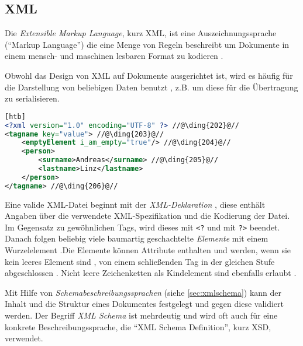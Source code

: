 \subsection{XML}

\begin{thesisDefinition}[XML]
Die \emph{Extensible Markup Language}, kurz \gls{XML}, ist eine Auszeichnungssprache (\enquote{Markup Language}) die eine Menge von Regeln beschreibt um Dokumente in einem mensch- und maschinen lesbaren Format zu kodieren \cite{XML10Specification}.
\end{thesisDefinition}
Obwohl das Design von XML auf Dokumente ausgerichtet ist, wird es häufig für die Darstellung von beliebigen Daten benutzt \cite{wiki:xml}, z.B. um diese für die Übertragung zu serialisieren.

\begin{lstlisting}[language=XML, caption=Minimalbeispiel für eine XML-Datei][htb]
<?xml version="1.0" encoding="UTF-8" ?> //@\ding{202}@//
<tagname key="value"> //@\ding{203}@//
    <emptyElement i_am_empty="true"/> //@\ding{204}@//
    <person>
        <surname>Andreas</surname> //@\ding{205}@//
        <lastname>Linz</lastname>
    </person>
</tagname> //@\ding{206}@//
\end{lstlisting}

Eine valide XML-Datei beginnt mit der \emph{XML-Deklaration} , diese enthält Angaben über die verwendete XML-Spezifikation und die Kodierung der Datei. 
Im Gegensatz zu gewöhnlichen Tags, wird dieses mit \texttt{<?} und mit \texttt{?>} beendet. 
Danach folgen beliebig viele baumartig geschachtelte \emph{Elemente} mit einem Wurzelelement .Die Elemente können Attribute enthalten und werden, wenn sie kein leeres Element sind , von einem schließenden Tag in der gleichen Stufe abgeschlossen . Nicht leere Zeichenketten als Kindelement sind ebenfalls erlaubt .

Mit Hilfe von \emph{Schemabeschreibungssprachen} (siehe \cref{sec:xmlschema}) kann der Inhalt und die Struktur eines Dokumentes festgelegt und gegen diese validiert werden. Der Begriff \emph{XML Schema} ist mehrdeutig und wird oft auch für eine konkrete Beschreibungssprache, die \enquote{XML Schema Definition}, kurz \gls{XSD}, verwendet.
